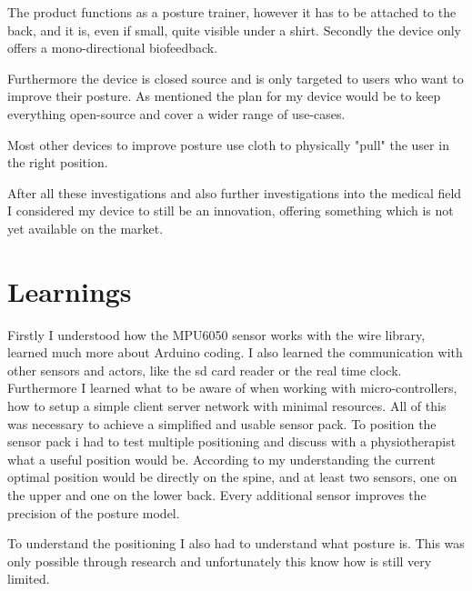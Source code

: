 The product functions as a posture trainer, however it has to be attached to the back, and it is, even if small, quite visible under a shirt. Secondly the device only offers a mono-directional biofeedback. \cite{HowToImp2:online}

Furthermore the device is closed source and is only targeted to users who want to improve their posture. As mentioned the plan for my device would be to keep everything open-source and cover a wider range of use-cases. 

Most other devices to improve posture use cloth to physically "pull" the user in the right position.

After all these investigations and also further investigations into the medical field I considered my device to still be an innovation, offering something which is not yet available on the market.


\section{Learnings}

Firstly I understood how the MPU6050 sensor works with the wire library, learned much more about Arduino coding. I also learned the communication with other sensors and actors, like the sd card reader or the real time clock. Furthermore I learned what to be aware of when working with micro-controllers, how to setup a simple client server network with minimal resources. All of this was necessary to achieve a simplified and usable sensor pack. 
To position the sensor pack i had to test multiple positioning and discuss with a physiotherapist what a useful position would be. According to my understanding the current optimal position would be directly on the spine, and at least two sensors, one on the upper and one on the lower back. Every additional sensor improves the precision of the posture model. 

To understand the positioning I also had to understand what posture is. This was only possible through research and unfortunately this know how is still very limited.